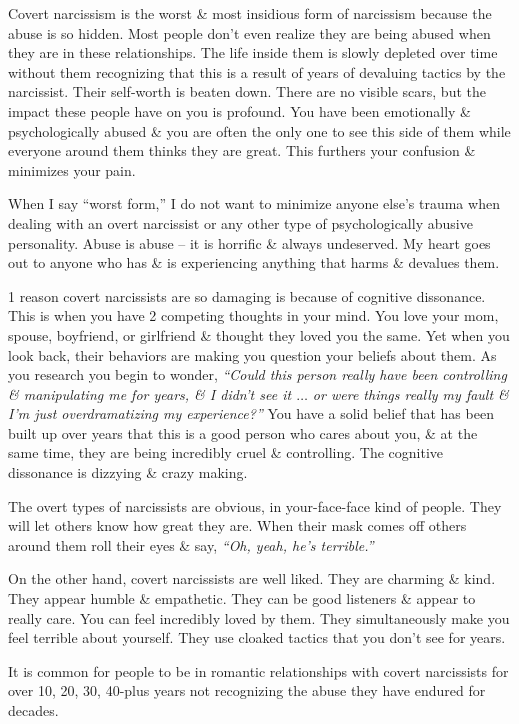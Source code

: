 \documentclass{article}
\numberwithin{equation}{section}
\begin{document}
Covert narcissism is the worst \& most insidious form of narcissism because the abuse is so hidden. Most people don't even realize they are being abused when they are in these relationships. The life inside them is slowly depleted over time without them recognizing that this is a result of years of devaluing tactics by the narcissist. Their self-worth is beaten down. There are no visible scars, but the impact these people have on you is profound. You have been emotionally \& psychologically abused \& you are often the only one to see this side of them while everyone around them thinks they are great. This furthers your confusion \& minimizes your pain.

When I say ``worst form,'' I do not want to minimize anyone else's trauma when dealing with an overt narcissist or any other type of psychologically abusive personality. Abuse is abuse -- it is horrific \& always undeserved. My heart goes out to anyone who has \& is experiencing anything that harms \& devalues them.

1 reason covert narcissists are so damaging is because of cognitive dissonance. This is when you have 2 competing thoughts in your mind. You love your mom, spouse, boyfriend, or girlfriend \& thought they loved you the same. Yet when you look back, their behaviors are making you question your beliefs about them. As you research you begin to wonder, \textit{``Could this person really have been controlling \& manipulating me for years, \& I didn't see it $\ldots$ or were things really my fault \& I'm just overdramatizing my experience?''} You have a solid belief that has been built up over years that this is a good person who cares about you, \& at the same time, they are being incredibly cruel \& controlling. The cognitive dissonance is dizzying \& crazy making.

The overt types of narcissists are obvious, in your-face-face kind of people. They will let others know how great they are. When their mask comes off others around them roll their eyes \& say, \textit{``Oh, yeah, he's terrible.''}

On the other hand, covert narcissists are well liked. They are charming \& kind. They appear humble \& empathetic. They can be good listeners \& appear to really care. You can feel incredibly loved by them. They simultaneously make you feel terrible about yourself. They use cloaked tactics that you don't see for years.

It is common for people to be in romantic relationships with covert narcissists for over 10, 20, 30, 40-plus years not recognizing the abuse they have endured for decades.
\end{document}
